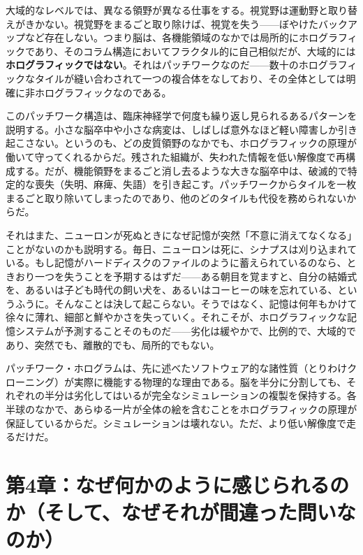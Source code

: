 \documentclass[11pt, twoside, openright]{book}
\begin{document}
大域的なレベルでは、異なる領野が異なる仕事をする。視覚野は運動野と取り替えがきかない。視覚野をまるごと取り除けば、視覚を失う------ぼやけたバックアップなど存在しない。つまり脳は、各機能領域のなかでは局所的にホログラフィックであり、そのコラム構造においてフラクタル的に自己相似だが、大域的には\textbf{ホログラフィックではない}。それはパッチワークなのだ------数十のホログラフィックなタイルが縫い合わされて一つの複合体をなしており、その全体としては明確に非ホログラフィックなのである。

このパッチワーク構造は、臨床神経学で何度も繰り返し見られるあるパターンを説明する。小さな脳卒中や小さな病変は、しばしば意外なほど軽い障害しか引き起こさない。というのも、どの皮質領野のなかでも、ホログラフィックの原理が働いて守ってくれるからだ。残された組織が、失われた情報を低い解像度で再構成する。だが、機能領野をまるごと消し去るような大きな脳卒中は、破滅的で特定的な喪失（失明、麻痺、失語）を引き起こす。パッチワークからタイルを一枚まるごと取り除いてしまったのであり、他のどのタイルも代役を務められないからだ。

それはまた、ニューロンが死ぬときになぜ記憶が突然「不意に消えてなくなる」ことがないのかも説明する。毎日、ニューロンは死に、シナプスは刈り込まれている。もし記憶がハードディスクのファイルのように蓄えられているのなら、ときおり一つを失うことを予期するはずだ------ある朝目を覚ますと、自分の結婚式を、あるいは子ども時代の飼い犬を、あるいはコーヒーの味を忘れている、というふうに。そんなことは決して起こらない。そうではなく、記憶は何年もかけて徐々に薄れ、細部と鮮やかさを失っていく。それこそが、ホログラフィックな記憶システムが予測することそのものだ------劣化は緩やかで、比例的で、大域的であり、突然でも、離散的でも、局所的でもない。

パッチワーク・ホログラムは、先に述べたソフトウェア的な諸性質（とりわけクローニング）が実際に機能する物理的な理由である。脳を半分に分割しても、それぞれの半分は劣化してはいるが完全なシミュレーションの複製を保持する。各半球のなかで、あらゆる一片が全体の絵を含むことをホログラフィックの原理が保証しているからだ。シミュレーションは壊れない。ただ、より低い解像度で走るだけだ。


\chapter*{第4章：なぜ何かのように感じられるのか（そして、なぜそれが間違った問いなのか）}
\end{document}
